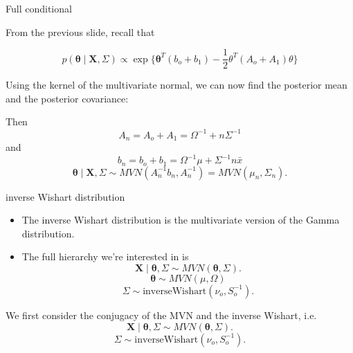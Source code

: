 \documentclass[ignorenonframetext,]{beamer}
\newcommand{\btheta}{{\bm\theta}}
\newcommand{\bx}{\ensuremath{\mathbf{X}}}
\begin{document}
\begin{frame}{Full conditional}

From the previous slide, recall that

\[p(\btheta \mid \bx, \Sigma) \propto
\exp\{
\btheta^T( b_o + b_1) -\frac{1}{2}\theta^T(A_o + A_1) \theta
\}\]

Using the kernel of the multivariate normal, we can now find the
posterior mean and the posterior covariance:

Then \[A_n = A_o + A_1 = \Omega^{-1}+n\Sigma^{-1}\] and
\[b_n = b_o + b_1 = \Omega^{-1}\mu + \Sigma^{-1} n\bar{x}\]
\[\btheta \mid \bx, \Sigma \sim MVN(A_n^{-1}b_n, A_n^{-1}) = MVN(\mu_n, \Sigma_n).\]

\end{frame}



\begin{frame}{inverse Wishart distribution}

\begin{itemize}
\item The inverse Wishart distribution is the multivariate version of the Gamma distribution. 
\item The full hierarchy we're interested in is 
$$\bm{X} \mid \btheta, \Sigma \sim MVN(\btheta, \Sigma).$$ 
$$ \btheta \sim MVN(\mu, \Omega)$$
$$ \Sigma \sim \text{inverseWishart}(\nu_o, S_o^{-1}).$$
\end{itemize}

We first consider the conjugacy of the MVN and the inverse Wishart, i.e.
\[\bm{X} \mid \btheta, \Sigma \sim MVN(\btheta, \Sigma).\]
\[ \Sigma \sim \text{inverseWishart}(\nu_o, S_o^{-1}).\]

\end{frame}
\end{document}
